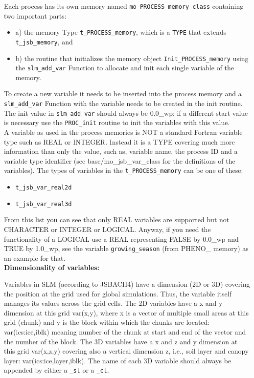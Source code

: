 Each process has its own memory named \texttt{mo{\_}PROCESS{\_}memory{\_}class} containing two important parts: 
\begin{itemize}
\item a) the memory Type \texttt{t{\_}PROCESS{\_}memory}, which is a \texttt{TYPE} that extends \texttt{t{\_}jsb{\_}memory}, and 
\item b) the routine that initializes the memory object \texttt{Init{\_}PROCESS{\_}memory} using the \texttt{slm{\_}add{\_}var} Function to allocate and init each single variable of the memory.
\end{itemize}
To create a new variable it needs to be inserted into the process memory and a \texttt{slm{\_}add{\_}var} Function with the variable needs to be created in the init routine. The init value in \texttt{slm{\_}add{\_}var} should always be 0.0{\_}wp; if a different start value is necessary use the \texttt{PROC{\_}init} routine to init the variables with this value. \\

A variable as used in the process memories is NOT a standard Fortran variable type such as REAL or INTEGER. Instead it is a TYPE covering much more information than only the value, such as, variable name, the process ID and a variable type identifier (see base/mo{\_}jsb{\_}var{\_}class for the definitions of the variables). The types of variables in the \texttt{t{\_}PROCESS{\_}memory} can be one of these:
\begin{itemize}
	\item \texttt{t{\_}jsb{\_}var{\_}real2d}
	\item \texttt{t{\_}jsb{\_}var{\_}real3d}
\end{itemize}
From this list you can see that only REAL variables are supported but not CHARACTER or INTEGER or LOGICAL. Anyway, if you need the functionality of a LOGICAL use a REAL representing FALSE by 0.0\_wp and TRUE by 1.0\_wp, see the variable \texttt{growing\_season} (from PHENO\_ memory) as an example for that.\\

\textbf{Dimensionality of variables:}

Variables in SLM (according to JSBACH4) have a dimension (2D or 3D) covering the position at the grid used for global simulations. Thus, the variable itself manages its values across the grid cells. The 2D variables have a x and y dimension at this grid var(x,y), where x is a vector of multiple small areas at this grid (chunk) and y is the block within which the chunks are located: var(ics:ice,iblk) meaning number of the chunk at start and end of the vector and the number of the block. The 3D variables have a x and z and y dimension at this grid var(x,z,y) covering also a vertical dimension z, i.e., soil layer and canopy layer: var(ics:ice,layer,iblk). The name of each 3D variable should always be appended by either a \texttt{{\_}sl} or a \texttt{{\_}cl}.

